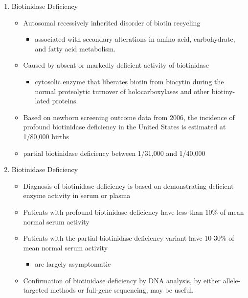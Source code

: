 \documentclass{scrartcl}
\begin{document}
\begin{enumerate}
\item Biotinidase Deficiency
\label{sec:orge3a7109}

\begin{itemize}
\item Autosomal recessively inherited disorder of biotin recycling
\begin{itemize}
\item associated with secondary alterations in amino acid, carbohydrate,
and fatty acid metabolism.
\end{itemize}
\item Caused by absent or markedly deficient activity of biotinidase
\begin{itemize}
\item cytosolic enzyme that liberates biotin from biocytin during the
normal proteolytic turnover of holocarboxylases and other
biotiny-lated proteins.
\end{itemize}

\item Based on newborn screening outcome data from 2006, the incidence of
profound biotinidase deficiency in the United States is estimated at
1/80,000 births
\item partial biotinidase deficiency between 1/31,000 and 1/40,000
\end{itemize}

\item Biotinidase Deficiency
\label{sec:orge503eed}

\begin{itemize}
\item Diagnosis of biotinidase deficiency is based on demonstrating
deficient enzyme activity in serum or plasma

\item Patients with profound biotinidase deficiency have less than 10\% of
mean normal serum activity

\item Patients with the partial biotinidase deficiency variant have 10-30\%
of mean normal serum activity
\begin{itemize}
\item are largely asymptomatic
\end{itemize}

\item Confirmation of biotinidase deficiency by DNA analysis, by either
allele-targeted methods or full-gene sequencing, may be useful.
\end{itemize}


\end{enumerate}
\end{document}
